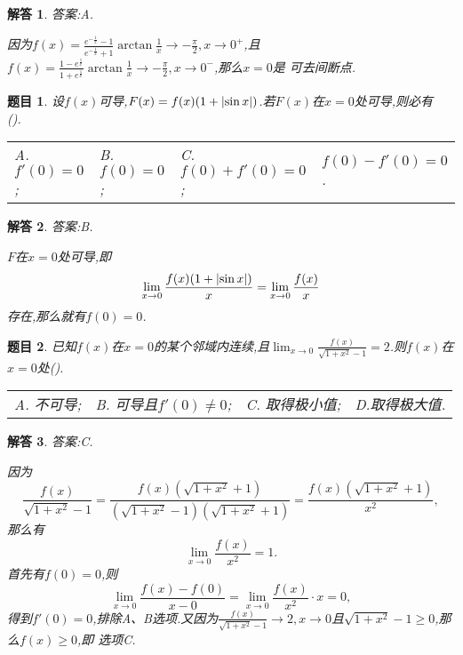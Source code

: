 \documentclass[a4paper,oneside,12pt]{ctexart}
\theoremstyle{plain}
\newtheorem{task}{题目}[section]
\theoremstyle{nonumberplain}
\newtheorem{solution}{解答}
\theoremstyle{nonumberplain}
\theoremstyle{nonumberplain}
\theoremstyle{nonumberbreak}
\begin{document}
    \begin{solution}
        答案:A.

        因为$f(x)=\frac{e^{-\frac{1}{x}}-1}{e^{-\frac{1}{x}}+1}\arctan\frac{1}{x}\to -\frac{\pi}{2},x\to 0^+$,且
        $f(x)=\frac{1-e^{\frac{1}{x}}}{1+e^{\frac{1}{x}}}\arctan \frac{1}{x}\to-\frac{\pi}{2},x\to 0^-$,那么$x=0$是
        可去间断点.
    \end{solution}

    \begin{task}
        \label{ts:1.4}
        设$f(x)$可导,$F(x)=f(x)(1+\abs{\sin x})$.若$F(x)$在$x=0$处可导,则必有\\(\qquad).

        \begin{tabular}{llll}
            A. $f'(0)=0$; & B. $f(0)=0$; & C. $f(0)+f'(0)=0$; & $f(0)-f'(0)=0$.
        \end{tabular}
    \end{task}

    \begin{solution}
        答案:B.

        $F$在$x=0$处可导,即
        \begin{equation*}
            \lim_{x\to 0}\frac{f(x)(1+\abs{\sin x})}{x}=\lim_{x\to 0}\frac{f(x)}{x}
        \end{equation*}
        存在,那么就有$f(0)=0$.
    \end{solution}

    \begin{task}
        \label{ts:1.5}
        已知$f(x)$在$x=0$的某个邻域内连续,且$\lim_{x\to 0}\frac{f(x)}{\sqrt{1+x^2}-1}=2$.则$f(x)$在$x=0$处(\qquad).
        
        \begin{tabular}{llll}
            A. 不可导; & B. 可导且$f'(0)\neq 0$; & C. 取得极小值; & D.取得极大值.
        \end{tabular}
    \end{task}

    \begin{solution}
        答案:C.

        因为
        \begin{equation*}
            \frac{f(x)}{\sqrt{1+x^2}-1}=\frac{f(x)(\sqrt{1+x^2}+1)}{(\sqrt{1+x^2}-1)(\sqrt{1+x^2}+1)}=\frac{f(x)(\sqrt{1+x^2}+1)}{x^2},
        \end{equation*}
        那么有 
        \begin{equation*}
            \lim_{x\to 0}\frac{f(x)}{x^2}=1.
        \end{equation*}
        首先有$f(0)=0$,则 
        \begin{equation*}
            \lim_{x\to 0}\frac{f(x)-f(0)}{x-0}=\lim_{x\to 0}\frac{f(x)}{x^2}\cdot x=0,
        \end{equation*}
        得到$f'(0)=0$,排除A、B选项.又因为$\frac{f(x)}{\sqrt{1+x^2}-1}\to 2,x\to 0$且$\sqrt{1+x^2}-1\geqslant 0$,那么$f(x)\geqslant 0$,即
        选项C.
    \end{solution}
\end{document}
